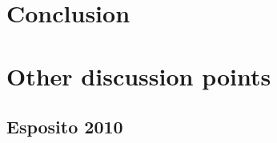 \documentclass[12pt, letterpaper]{article}
\begin{document}
\section{Conclusion} \label{sec:Conclusion}

\section{Other discussion points} \label{sec:OutsideOutline}

\subsection{Esposito 2010} \label{sec:Esposito}
\end{document}
